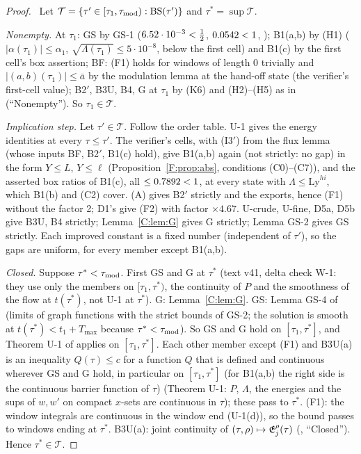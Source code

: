 \documentclass[11pt]{article}
\begin{document}
\begin{proof}\tHd\ Let $\mathcal T=\{\tau'\in[\tau_1,\tau_{\rm mod}):\mathrm{BS}(\tau')\}$ and $\tau^*=\sup\mathcal T$.

\emph{Nonempty.} At $\tau_1$: GS by GS-1 ($6.52\cdot10^{-3}<\frac12$, $0.0542<1$, ); B1(a,b) by (H1) ($|\alpha(\tau_1)|\le\alpha_1$, $\sqrt{\Lambda(\tau_1)}\le5\cdot10^{-8}$, below the first cell) and B1(c) by the first cell's box assertion; BF: (F1) holds for windows of length $0$ trivially and $|(a,b)(\tau_1)|\le\bar a$ by the modulation lemma at the hand-off state (the verifier's first-cell value); B2$'$, B3U, B4, G at $\tau_1$ by (K6) and (H2)--(H5) as in  (``Nonempty''). So $\tau_1\in\mathcal T$.

\emph{Implication step.} Let $\tau'\in\mathcal T$. Follow the order table. U-1 gives the energy identities at every $\tau\le\tau'$. The verifier's cells, with (I3$'$) from the flux lemma (whose inputs BF, B2$'$, B1(c) hold), give B1(a,b) again (not strictly: no gap) in the form $Y\le L$, $Y\le\ell$ (Proposition~\ref{F:prop:abs}, conditions (C0)--(C7)), and the asserted box ratios of B1(c), all $\le0.7892<1$, at every state with $\Lambda\le\mathrm{Ly}^{hi}$, which B1(b) and (C2) cover. (A) gives B2$'$ strictly and the exports, hence (F1) without the factor 2; D1's  give (F2) with factor $\times4.67$. U-crude, U-fine, D5a, D5b give B3U, B4 strictly; Lemma~\ref{C:lem:G} gives G strictly; Lemma GS-2 gives GS strictly. Each improved constant is a fixed number (independent of $\tau'$), so the gaps are uniform, for every member except B1(a,b).

\emph{Closed.} Suppose $\tau^*<\tau_{\rm mod}$. First GS and G at $\tau^*$ (text v41, delta check  W-1: they use only the members on $[\tau_1,\tau^*)$, the continuity of $P$ and the smoothness of the flow at $t(\tau^*)$, not U-1 at $\tau^*$). G: Lemma~\ref{C:lem:G}. GS: Lemma GS-4 of  (limits of graph functions with the strict bounds of GS-2; the solution is smooth at $t(\tau^*)<t_1+T_{\max}$ because $\tau^*<\tau_{\rm mod}$). So GS and G hold on $[\tau_1,\tau^*]$, and Theorem U-1 of  applies on $[\tau_1,\tau^*]$. Each other member except (F1) and B3U(a) is an inequality $Q(\tau)\le c$ for a function $Q$ that is defined and continuous wherever GS and G hold, in particular on $[\tau_1,\tau^*]$ (for B1(a,b) the right side is the continuous barrier function of $\tau$) (Theorem U-1: $P$, $\Lambda$, the energies and the sups of $w,w'$ on compact $x$-sets are continuous in $\tau$); these pass to $\tau^*$. (F1): the window integrals are continuous in the window end (U-1(d)), so the bound passes to windows ending at $\tau^*$. B3U(a): joint continuity of $(\tau,\rho)\mapsto\mathfrak E^\rho_j(\tau)$ (, ``Closed''). Hence $\tau^*\in\mathcal T$.


\end{proof}
\end{document}
